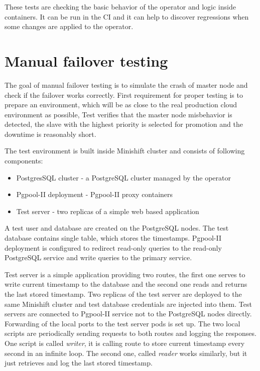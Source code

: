 \documentclass[
  digital, %
  twoside, %
  table,   %
  lof,     %
  lot,     %
]{fithesis3}
\begin{document}
These tests are checking the basic behavior of the operator and logic inside containers. It can be run in the CI and it can help to discover regressions when some changes are applied to the operator.

\section{Manual failover testing}
The goal of manual failover testing is to simulate the crash of master node and check if the failover works correctly. First requirement for proper testing is to prepare an environment, which will be as close to the real production cloud environment as possible, Test verifies that the master node misbehavior is detected, the slave with the highest priority is selected for promotion and the downtime is reasonably short.

The test environment is built inside Minishift cluster and consists of following components:
\begin{itemize}
  \item PostgresSQL cluster - a PostgreSQL cluster managed by the operator 
  \item Pgpool-II deployment - Pgpool-II proxy containers
  \item Test server - two replicas of a simple web based application
\end{itemize}

A test user and database are created on the PostgreSQL nodes. The test database contains single table, which stores the timestamps. Pgpool-II deployment is configured to redirect read-only queries to the read-only PostgreSQL service and write queries to the primary service.

Test server is a simple application providing two routes, the first one serves to write current timestamp to the database and the second one reads and returns the last stored timestamp. Two replicas of the test server are deployed to the same Minishift cluster and test database credentials are injected into them. Test servers are connected to Pgpool-II service not to the PostgreSQL nodes directly. Forwarding of the local ports to the test server pods is set up. The two local scripts are periodically sending requests to both routes and logging the responses. One script is called \textit{writer}, it is calling route to store current timestamp every second in an infinite loop. The second one, called \textit{reader} works similarly, but it just retrieves and log the last stored timestamp.
\end{document}
